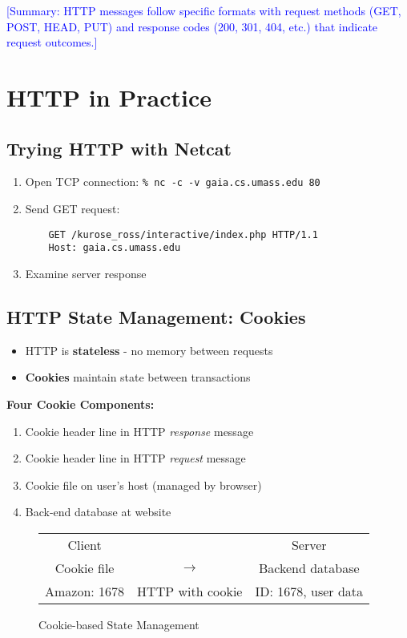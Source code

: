 \documentclass[12pt]{article}
\begin{document}
\textcolor{blue}{[Summary: HTTP messages follow specific formats with request methods (GET, POST, HEAD, PUT) and response codes (200, 301, 404, etc.) that indicate request outcomes.]}

\section{HTTP in Practice}

\subsection{Trying HTTP with Netcat}
\begin{enumerate}
    \item Open TCP connection: \texttt{\% nc -c -v gaia.cs.umass.edu 80}
    \item Send GET request:
          \begin{verbatim}
    GET /kurose_ross/interactive/index.php HTTP/1.1
    Host: gaia.cs.umass.edu
    \end{verbatim}
    \item Examine server response
\end{enumerate}

\subsection{HTTP State Management: Cookies}
\begin{itemize}
    \item HTTP is \textbf{stateless} - no memory between requests
    \item \textbf{Cookies} maintain state between transactions
\end{itemize}

\textbf{Four Cookie Components:}
\begin{enumerate}
    \item Cookie header line in HTTP \textit{response} message
    \item Cookie header line in HTTP \textit{request} message
    \item Cookie file on user's host (managed by browser)
    \item Back-end database at website
\end{enumerate}

\begin{figure}[h]
    \centering
    \begin{tabular}{c c c}
        Client       &                  & Server              \\
        Cookie file  & $\rightarrow$    & Backend database    \\
        Amazon: 1678 & HTTP with cookie & ID: 1678, user data \\
    \end{tabular}
    \caption{Cookie-based State Management}
\end{figure}
\end{document}
